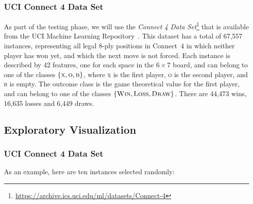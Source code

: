 \documentclass{article}
\begin{document}
\subsubsection{UCI Connect 4 Data Set}

\newcommand{\URLUCI}{\url{https://archive.ics.uci.edu/ml/datasets/Connect-4}}

As part of the testing phase, we will use the \emph{Connect 4 Data Set}\footnote{\URLUCI{}} that is
available from the UCI Machine Learning Repository~\citep{Hettich1998UCI}. This dataset has a total
of 67,557 instances, representing all legal 8-ply positions in \mbox{Connect 4} in which neither
player has won yet, and which the next move is not forced. Each instance is described by 42
features, one for each space in the $6 \times 7$ board, and can belong to one of the classes
$\{\textsc{x}, \textsc{o}, \textsc{b}\}$, where \textsc{x} is the first player, \textsc{o} is the
second player, and \textsc{b} is empty. The outcome class is the game theoretical value for the
first player, and can belong to one of the classes $\{\textsc{Win}, \textsc{Loss}, \textsc{Draw}\}$.
There are 44,473 wins, 16,635 losses and 6,449 draws.

\subsection{Exploratory Visualization}

\subsubsection{UCI Connect 4 Data Set}

As an example, here are ten instances selected randomly:
\end{document}
